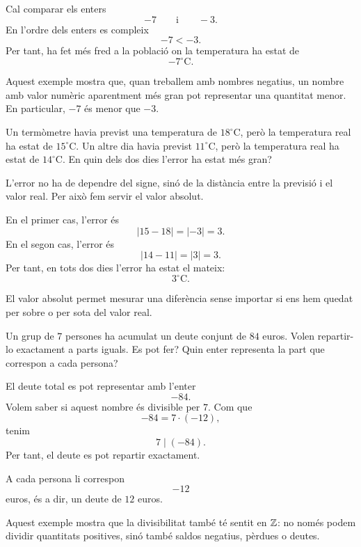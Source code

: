 \begin{solucio}
Cal comparar els enters
\[
-7
\qquad\text{i}\qquad
-3.
\]
En l'ordre dels enters es compleix
\[
-7<-3.
\]
Per tant, ha fet més fred a la població on la temperatura ha estat de
\[
-7^\circ\text{C}.
\]

Aquest exemple mostra que, quan treballem amb nombres negatius, un nombre amb valor numèric aparentment més gran pot representar una quantitat menor. En particular, \(-7\) és menor que \(-3\).
\end{solucio}


\begin{exercici}
Un termòmetre havia previst una temperatura de \(18^\circ\text{C}\), però la temperatura real ha estat de \(15^\circ\text{C}\). Un altre dia havia previst \(11^\circ\text{C}\), però la temperatura real ha estat de \(14^\circ\text{C}\). En quin dels dos dies l'error ha estat més gran?
\end{exercici}

\begin{solucio}
L'error no ha de dependre del signe, sinó de la distància entre la previsió i el valor real. Per això fem servir el valor absolut.

En el primer cas, l'error és
\[
|15-18|=|-3|=3.
\]
En el segon cas, l'error és
\[
|14-11|=|3|=3.
\]
Per tant, en tots dos dies l'error ha estat el mateix:
\[
3^\circ\text{C}.
\]

El valor absolut permet mesurar una diferència sense importar si ens hem quedat per sobre o per sota del valor real.
\end{solucio}


\begin{exercici}
Un grup de \(7\) persones ha acumulat un deute conjunt de \(84\) euros. Volen repartir-lo exactament a parts iguals. Es pot fer? Quin enter representa la part que correspon a cada persona?
\end{exercici}

\begin{solucio}
El deute total es pot representar amb l'enter
\[
-84.
\]
Volem saber si aquest nombre és divisible per \(7\). Com que
\[
-84=7\cdot(-12),
\]
tenim
\[
7\mid(-84).
\]
Per tant, el deute es pot repartir exactament.

A cada persona li correspon
\[
-12
\]
euros, és a dir, un deute de \(12\) euros.

Aquest exemple mostra que la divisibilitat també té sentit en \(\mathbb{Z}\): no només podem dividir quantitats positives, sinó també saldos negatius, pèrdues o deutes.
\end{solucio}

